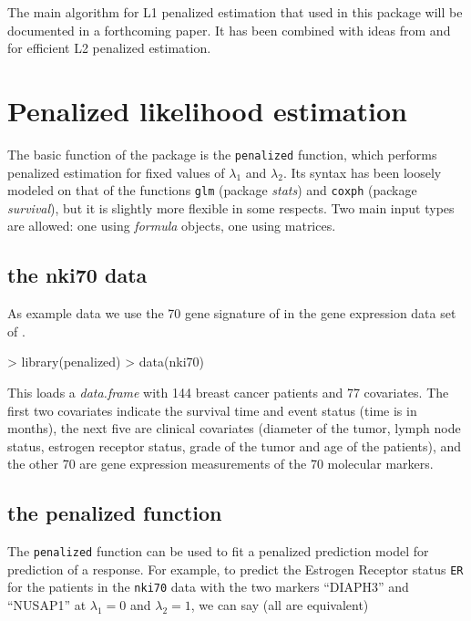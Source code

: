 \documentclass[a4paper]{article}
\newcommand{\Robject}[1]{{\texttt{#1}}}
\newcommand{\Rfunction}[1]{{\texttt{#1}}}
\newcommand{\Rpackage}[1]{{\textit{#1}}}
\newcommand{\Rclass}[1]{{\textit{#1}}}
\begin{document}
The main algorithm for L1 penalized estimation that used in this package will be documented in a forthcoming paper. It has been combined with ideas from \cite{Eilers2001} and \cite{Houwelingen2006} for efficient L2 penalized estimation.


\section{Penalized likelihood estimation}

The basic function of the package is the \Rfunction{penalized} function, which performs penalized estimation for fixed values of $\lambda_1$ and $\lambda_2$. Its syntax has been loosely modeled on that of the functions \Rfunction{glm} (package \Rpackage{stats}) and \Rfunction{coxph} (package \Rpackage{survival}), but it is slightly more flexible in some respects. Two main input types are allowed: one using \Rclass{formula} objects, one using matrices.

\subsection{the nki70 data}

As example data we use the 70 gene signature of \cite{Veer2002} in the gene expression data set of \cite{Vijver2002}.

\begin{Schunk}
\begin{Sinput}
> library(penalized)
> data(nki70)
\end{Sinput}
\end{Schunk}

This loads a \Rclass{data.frame} with 144 breast cancer patients and 77 covariates. The first two covariates indicate the survival time and event status (time is in months), the next five are clinical covariates (diameter of the tumor, lymph node status, estrogen receptor status, grade of the tumor and age of the patients), and the other 70 are gene expression measurements of the 70 molecular markers.

\subsection{the penalized function}

The \Rfunction{penalized} function can be used to fit a penalized prediction model for prediction of a response. For example, to predict the Estrogen Receptor status \Robject{ER} for the patients in the \Robject{nki70} data with the two markers ``DIAPH3'' and ``NUSAP1'' at $\lambda_1 = 0$ and $\lambda_2 = 1$, we can say (all are equivalent)
\end{document}
